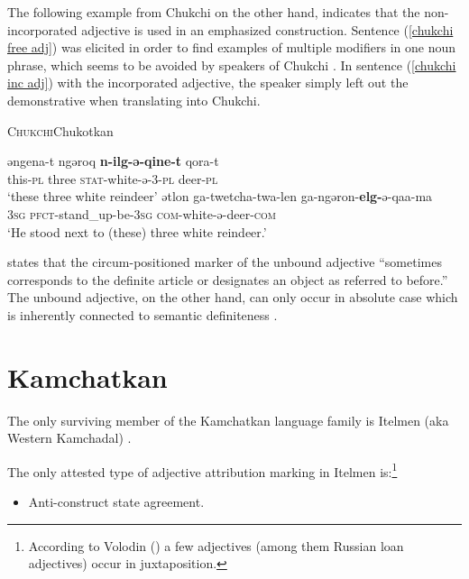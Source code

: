 The following example from Chukchi on the other hand, indicates that the non-incorporated adjective is used in an emphasized construction. Sentence (\ref{chukchi free adj}) was elicited in order to find examples of multiple modifiers in one noun phrase, which seems to be avoided by speakers of Chukchi \cite[330]{rijkhoff2002}. In sentence (\ref{chukchi inc adj}) with the incorporated adjective, the speaker simply left out the demonstrative when translating into Chukchi.
\begin{exe}
\ex \textsc{Chukchi}{Chukotkan}{\cite[330]{rijkhoff2002}}
\begin{xlist}
\ex \label{chukchi free adj}
\gll	əngena-t ngəroq \textbf{n-ilg-ə-qine-t} qora-t\\
	this-\textsc{pl} three \textsc{stat}-white-ə-3-\textsc{pl} deer-\textsc{pl}\\
\glt	‘these three white reindeer’
\ex \label{chukchi inc adj}
\gll	ətlon ga-twetcha-twa-len ga-ngəron-\textbf{elg-}ə-qaa-ma\\
	\textsc{3sg} \textsc{pfct}-stand\_up-be-\textsc{3sg} \textsc{com}-white-ə-deer-\textsc{com}\\
\glt	‘He stood next to (these) three white reindeer.’
\end{xlist}
\end{exe}
\citet[716]{bogoras1922} states that the circum-positioned marker of the unbound adjective “sometimes corresponds to the definite article or designates an object as referred to before.” The unbound adjective, on the other hand, can only occur in absolute case which is inherently connected to semantic definiteness \citep[cf.][207, elsewhere]{dunn1999}.

\section{Kamchatkan}
The only surviving member of the Kamchatkan language family is Itelmen (aka Western Kamchadal) \citep[224]{salminen2007}.

The only attested type of adjective attribution marking in Itelmen is:\footnote{According to Volodin (\citeyear{volodin1997}) a few adjectives (among them Russian loan adjectives) occur in juxtaposition.}
\begin{itemize}
\item Anti-construct state agreement.
\end{itemize}

